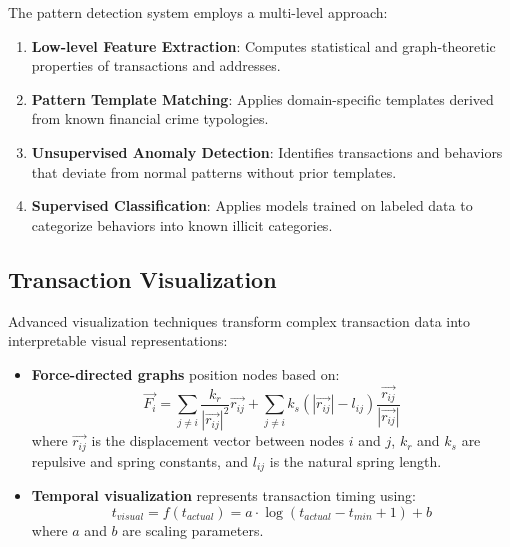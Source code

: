 \documentclass[conference]{IEEEtran}
\begin{document}
The pattern detection system employs a multi-level approach:

\begin{enumerate}
    \item \textbf{Low-level Feature Extraction}: Computes statistical and graph-theoretic properties of transactions and addresses.
    
    \item \textbf{Pattern Template Matching}: Applies domain-specific templates derived from known financial crime typologies.
    
    \item \textbf{Unsupervised Anomaly Detection}: Identifies transactions and behaviors that deviate from normal patterns without prior templates.
    
    \item \textbf{Supervised Classification}: Applies models trained on labeled data to categorize behaviors into known illicit categories.
\end{enumerate}

\subsection{Transaction Visualization}

Advanced visualization techniques transform complex transaction data into interpretable visual representations:

\begin{itemize}
    \item \textbf{Force-directed graphs} position nodes based on:
    \begin{equation}
    \vec{F_i} = \sum_{j \neq i} \frac{k_r}{|\vec{r_{ij}}|^2}\vec{r_{ij}} + \sum_{j \neq i} k_s(|\vec{r_{ij}}| - l_{ij})\frac{\vec{r_{ij}}}{|\vec{r_{ij}}|}
    \end{equation}
    where $\vec{r_{ij}}$ is the displacement vector between nodes $i$ and $j$, $k_r$ and $k_s$ are repulsive and spring constants, and $l_{ij}$ is the natural spring length.
    
    \item \textbf{Temporal visualization} represents transaction timing using:
    \begin{equation}
    t_{visual} = f(t_{actual}) = a \cdot \log(t_{actual} - t_{min} + 1) + b
    \end{equation}
    where $a$ and $b$ are scaling parameters.
\end{itemize}
\end{document}
